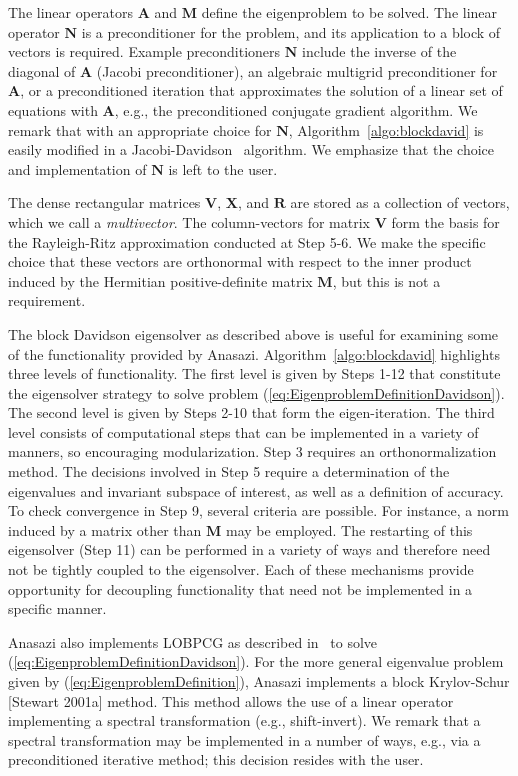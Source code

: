 \documentclass[acmtoms,acmnow]{acmtrans2m}
\begin{document}
The linear operators $\mathbf{A}$ and $\mathbf{M}$ define the
eigenproblem to be solved. The linear operator $\mathbf{N}$ is a
preconditioner for the problem, and its application to a block of
vectors is required. Example preconditioners $\mathbf{N}$ include
the inverse of the diagonal of $\mathbf{A}$ (Jacobi preconditioner),
an algebraic multigrid preconditioner for $\mathbf{A}$, or a
preconditioned iteration that approximates the solution of a linear
set of equations with $\mathbf{A}$, e.g., the preconditioned
conjugate gradient algorithm. We remark that with an appropriate
choice for $\mathbf{N}$, Algorithm~\ref{algo:blockdavid} is easily
modified in a Jacobi-Davidson~\cite{slvo:96} algorithm. We emphasize that
the choice and implementation of $\mathbf{N}$ is left to the user.

The dense rectangular matrices $\mathbf{V}$, $\mathbf{X}$, and
$\mathbf{R}$ are stored as a collection of vectors, which we call a
\emph{multivector}. 
The column-vectors for matrix $\mathbf{V}$ form
the basis for the Rayleigh-Ritz approximation conducted at Step 5-6.
We make the specific choice that these vectors are orthonormal with
respect to the inner product induced by the Hermitian
positive-definite matrix $\mathbf{M}$, but this is not a requirement.

The block Davidson eigensolver as described above is useful for examining some of the
functionality provided by Anasazi. Algorithm~\ref{algo:blockdavid} highlights three levels
of functionality. The first level is given by Steps 1-12 that constitute the eigensolver
strategy to solve problem (\ref{eq:EigenproblemDefinitionDavidson}). The second level is
given by Steps 2-10 that form the eigen-iteration. The third level consists of
computational steps that can be implemented in a variety of manners, so encouraging
modularization. Step 3 requires an orthonormalization method. The decisions involved in
Step 5 require a determination of the eigenvalues and invariant subspace of interest, as
well as a definition of accuracy. To check convergence in Step 9, several criteria are
possible. For instance, a norm induced by a matrix other than $\mathbf{M}$ may be
employed. The restarting of this eigensolver (Step 11) can be performed in a variety of
ways and therefore need not be tightly coupled to the eigensolver. Each of these
mechanisms provide opportunity for decoupling functionality that need not be implemented
in a specific manner.

Anasazi also implements LOBPCG as described in~\cite{Hetmaniuk:2006:BSL} to solve
(\ref{eq:EigenproblemDefinitionDavidson}). For the more general eigenvalue problem given
by (\ref{eq:EigenproblemDefinition}), Anasazi implements a block Krylov-Schur [Stewart
2001a] method. This method allows the use of a linear operator implementing a spectral
transformation (e.g., shift-invert). We remark that a spectral transformation may be
implemented in a number of ways, e.g., via a preconditioned iterative method; this
decision resides with the user.
\end{document}
